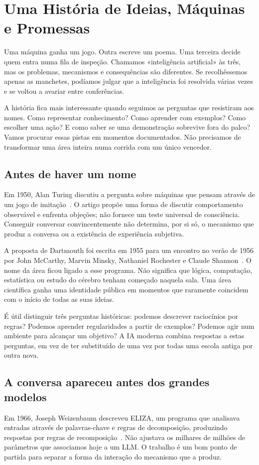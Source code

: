 \chapter{Uma História de Ideias, Máquinas e Promessas}
\label{ch:historia}

Uma máquina ganha um jogo. Outra escreve um poema. Uma terceira decide quem entra numa fila de inspeção. Chamamos «inteligência artificial» às três, mas os problemas, mecanismos e consequências são diferentes. Se recolhêssemos apenas as manchetes, podíamos julgar que a inteligência foi resolvida várias vezes e se voltou a avariar entre conferências.

A história fica mais interessante quando seguimos as perguntas que resistiram aos nomes. Como representar conhecimento? Como aprender com exemplos? Como escolher uma ação? E como saber se uma demonstração sobrevive fora do palco? Vamos procurar essas pistas em momentos documentados. Não precisamos de transformar uma área inteira numa corrida com um único vencedor.

\section{Antes de haver um nome}
Em 1950, Alan Turing discutiu a pergunta sobre máquinas que pensam através de um jogo de imitação~\citep{turing1950}. O artigo propõe uma forma de discutir comportamento observável e enfrenta objeções; não fornece um teste universal de consciência. Conseguir conversar convincentemente não determina, por si só, o mecanismo que produz a conversa ou a existência de experiência subjetiva.

A proposta de Dartmouth foi escrita em 1955 para um encontro no verão de 1956 por John McCarthy, Marvin Minsky, Nathaniel Rochester e Claude Shannon~\citep{dartmouth1955}. O nome da área ficou ligado a esse programa. Não significa que lógica, computação, estatística ou estudo do cérebro tenham começado naquela sala. Uma área científica ganha uma identidade pública em momentos que raramente coincidem com o início de todas as suas ideias.

É útil distinguir três perguntas históricas: podemos descrever raciocínios por regras? Podemos aprender regularidades a partir de exemplos? Podemos agir num ambiente para alcançar um objetivo? A IA moderna combina respostas a estas perguntas, em vez de ter substituído de uma vez por todas uma escola antiga por outra nova.

\section{A conversa apareceu antes dos grandes modelos}
Em 1966, Joseph Weizenbaum descreveu ELIZA, um programa que analisava entradas através de palavras-chave e regras de decomposição, produzindo respostas por regras de recomposição~\citep{weizenbaum1966}. Não ajustava os milhares de milhões de parâmetros que associamos hoje a um LLM. O trabalho é um bom ponto de partida para separar a forma da interação do mecanismo que a produz.

